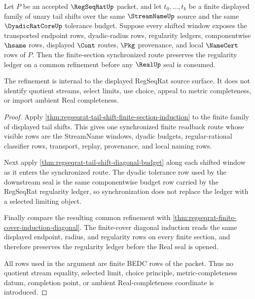 \begin{theorem}
\label{thm:regseqrat-tail-shift-regularity-refinement}
Let $P$ be an accepted $\RegSeqRatUp$ packet, and let
$t_0,\ldots,t_k$ be a finite displayed family of unary tail shifts over the
same $\StreamNameUp$ source and the same $\DyadicRatCoreUp$ tolerance budget.
Suppose every shifted window exposes the transported endpoint rows,
dyadic-radius rows, regularity ledgers, componentwise $\hsame$ rows, displayed
$\Cont$ routes, $\Pkg$ provenance, and local $\NameCert$ rows of $P$. Then the
finite-section synchronized route preserves the regularity ledger on a common
refinement before any $\RealUp$ seal is consumed.

The refinement is internal to the displayed RegSeqRat source surface. It does
not identify quotient streams, select limits, use choice, appeal to metric
completeness, or import ambient Real completeness.
\end{theorem}
\begin{proof}
Apply \autoref{thm:regseqrat-tail-shift-finite-section-induction} to the
finite family of displayed tail shifts. This gives one synchronized finite
readback route whose visible rows are the StreamName windows, dyadic budgets,
regular-rational classifier rows, transport, replay, provenance, and local
naming rows.

Next apply \autoref{thm:regseqrat-tail-shift-diagonal-budget} along each
shifted window as it enters the synchronized route. The dyadic tolerance row
used by the downstream seal is the same componentwise budget row carried by
the RegSeqRat regularity ledger, so synchronization does not replace the
ledger with a selected limiting object.

Finally compare the resulting common refinement with
\autoref{thm:regseqrat-finite-cover-induction-diagonal}. The finite-cover
diagonal induction reads the same displayed endpoint, radius, and regularity
rows on every finite section, and therefore preserves the regularity ledger
before the Real seal is opened.

All rows used in the argument are finite BEDC rows of the packet. Thus no
quotient stream equality, selected limit, choice principle, metric-completeness
datum, completion point, or ambient Real-completeness coordinate is introduced.
\end{proof}

